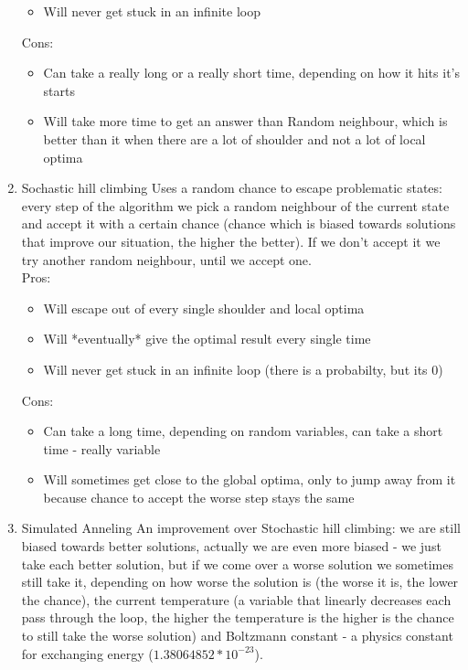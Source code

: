 \documentclass[10pt,a4paper]{article}
\begin{document}
\begin{enumerate}
\begin{itemize}
                                        \item Will never get stuck in an infinite loop
                                \end{itemize} 
                                Cons:
                                \begin{itemize}
                                        \item Can take a really long or a really short time, depending on how it hits it's starts
                                        \item Will take more time to get an answer than Random neighbour, which is better than it when there are a lot of shoulder and not a lot of local optima
                                \end{itemize}
			\item Sochastic hill climbing 
				Uses a random chance to escape problematic states: every step of the algorithm we pick a random neighbour of the current state and accept it with a certain chance (chance which is biased towards solutions that improve our situation, the higher the better). If we don't accept it we try another random neighbour, until we accept one. \\
				Pros:
				\begin{itemize}
                                        \item Will escape out of every single shoulder and local optima
                                        \item Will *eventually* give the optimal result every single time
					\item Will never get stuck in an infinite loop (there is a probabilty, but its 0)
                                \end{itemize}
                                Cons:
                                \begin{itemize}
                                        \item Can take a long time, depending on random variables, can take a short time - really variable
                                        \item Will sometimes get close to the global optima, only to jump away from it because chance to accept the worse step stays the same
                                \end{itemize}
			\item Simulated Anneling
				An improvement over Stochastic hill climbing: we are still biased towards better solutions, actually we are even more biased - we just take each better solution, but if we come over a worse solution we sometimes still take it, depending on how worse the solution is (the worse it is, the lower the chance), the current temperature (a variable that linearly decreases each pass through the loop, the higher the temperature is the higher is the chance to still take the worse solution) and Boltzmann constant - a physics constant for exchanging energy ($1.38064852*10^{-23}$). \\

\end{enumerate}
\end{document}
